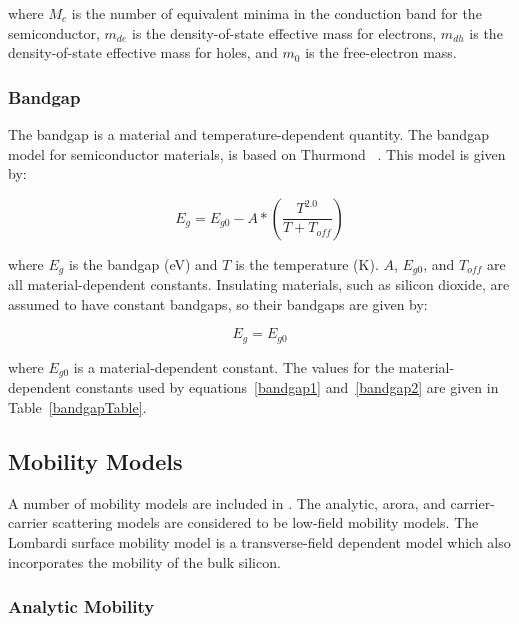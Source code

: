where $M_{c}$ is the number of equivalent minima in the conduction band for
the semiconductor, $m_{de}$ is the density-of-state effective mass for
electrons, $m_{dh}$ is the density-of-state effective mass for holes, and
$m_{0}$ is the free-electron mass.


\subsubsection{Bandgap}

The bandgap is a material and temperature-dependent quantity.  The bandgap
model for semiconductor materials, is based on Thurmond ~\cite{thurmond}.
This model is given by:

\begin{equation}
  E_g = E_{g0} - A * \left(\frac{T^{2.0}}{T + T_{off}}\right)
  \label{bandgap1}
\end{equation}

where $E_g$ is the bandgap (eV) and $T$ is the temperature (K). $A$,
$E_{g0}$, and $T_{off}$ are all material-dependent constants.  Insulating
materials, such as silicon dioxide, are assumed to have constant bandgaps, 
so their bandgaps are given by:

\begin{equation}
  E_g = E_{g0}
  \label{bandgap2}
\end{equation}

where $E_{g0}$ is a material-dependent constant.  The values for the
material-dependent constants used by equations~\ref{bandgap1} and~\ref{bandgap2} 
are given in Table~\ref{bandgapTable}.

\newpage

\subsection{Mobility Models}
\label{mobility}

A number of mobility models are included in \Xyce{}.  The analytic, arora,
and carrier-carrier scattering models are considered to be low-field
mobility models.  The Lombardi surface mobility model is a transverse-field
dependent model which also incorporates the mobility of the bulk silicon.

\subsubsection{Analytic Mobility}

